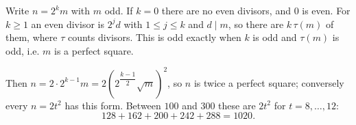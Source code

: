 Write $n=2^k m$ with $m$ odd. If $k=0$ there are no even divisors, and $0$ is even. For $k\ge1$ an even divisor is $2^j d$ with $1\le j\le k$ and $d\mid m$, so there are $k\,\tau(m)$ of them, where $\tau$ counts divisors. This is odd exactly when $k$ is odd and $\tau(m)$ is odd, i.e. $m$ is a perfect square.

Then $n=2\cdot 2^{k-1}m=2\left(2^{\dfrac{k-1}{2}}\sqrt m\right)^2$, so $n$ is twice a perfect square; conversely every $n=2t^2$ has this form. Between $100$ and $300$ these are $2t^2$ for $t=8,\dots,12$:
\[128+162+200+242+288=\boxed{1020}.\]
